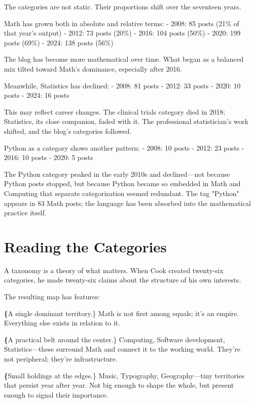 The categories are not static. Their proportions shift over the seventeen years.

Math has grown both in absolute and relative terms:
- 2008: 85 posts (21\% of that year's output)
- 2012: 73 posts (20\%)
- 2016: 104 posts (50\%)
- 2020: 199 posts (69\%)
- 2024: 138 posts (56\%)

The blog has become more mathematical over time. What began as a balanced mix tilted toward Math's dominance, especially after 2016.

Meanwhile, Statistics has declined:
- 2008: 81 posts
- 2012: 33 posts
- 2020: 10 posts
- 2024: 16 posts

This may reflect career changes. The clinical trials category died in 2018; Statistics, its close companion, faded with it. The professional statistician's work shifted, and the blog's categories followed.

Python as a category shows another pattern:
- 2008: 10 posts
- 2012: 23 posts
- 2016: 10 posts
- 2020: 5 posts

The Python category peaked in the early 2010s and declined—not because Python posts stopped, but because Python became so embedded in Math and Computing that separate categorization seemed redundant. The tag "Python" appears in 83 Math posts; the language has been absorbed into the mathematical practice itself.

\bigskip

\section*{Reading the Categories}

A taxonomy is a theory of what matters. When Cook created twenty-six categories, he made twenty-six claims about the structure of his own interests.

The resulting map has features:

\textbf\{A single dominant territory.\} Math is not first among equals; it's an empire. Everything else exists in relation to it.

\textbf\{A practical belt around the center.\} Computing, Software development, Statistics—these surround Math and connect it to the working world. They're not peripheral; they're infrastructure.

\textbf\{Small holdings at the edges.\} Music, Typography, Geography—tiny territories that persist year after year. Not big enough to shape the whole, but present enough to signal their importance.

